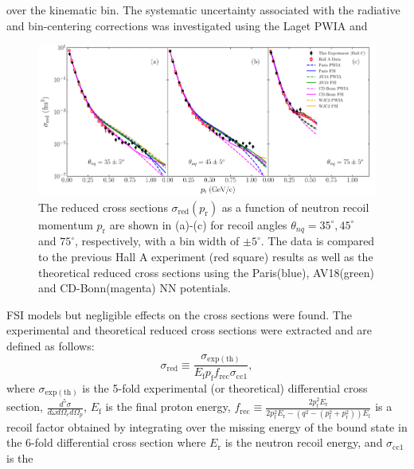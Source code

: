 over the kinematic bin. The systematic uncertainty associated with the radiative and bin-centering corrections was investigated using the Laget PWIA and 
\onecolumngrid
\begin{center}
\begin{figure}
\includegraphics[scale=0.46]{prl_plots/PRL_plot1_WJC2.pdf}
\caption{The reduced cross sections $\sigma_{\mathrm{red}}(p_{\mathrm{r}})$ as a function of neutron recoil momentum $p_{\mathrm{r}}$ are shown in (a)-(c) for recoil angles $\theta_{nq}=35^{\circ}, 45^{\circ}$ and $75^{\circ}$, respectively,
with a bin width of $\pm 5^{\circ}$. The data is compared to the previous Hall A experiment (red square) results \cite{PhysRevLett.107.262501} as well as the theoretical reduced cross sections using the Paris(blue),
AV18(green) and CD-Bonn(magenta) NN potentials.}
\label{fig:fig1}
\end{figure}
\end{center}
\twocolumngrid
\noindent FSI models but negligible effects on the cross sections were found. The experimental and theoretical reduced cross sections were extracted and are defined as follows:
\begin{equation}
\sigma_{\mathrm{red}} \equiv \frac{\sigma_{\mathrm{exp(th)}}}{E_{\mathrm{f}}p_{\mathrm{f}}f_{\mathrm{rec}}\sigma_{\mathrm{cc1}}},
\label{eq:1}
\end{equation}
\noindent where $\sigma_{\mathrm{exp(th)}}$ is the 5-fold experimental (or theoretical) differential cross section, $\frac{d^{5}\sigma}{d\omega d\Omega_{e} d\Omega_{p}}$,
$E_{\mathrm{f}}$ is the final proton energy, $f_{\mathrm{rec}}\equiv \frac{2p_{\mathrm{f}}^{2}E_{\mathrm{r}}}{2p_{\mathrm{f}}^{2}E_{\mathrm{r}} - (q^{2} - (p_{\mathrm{f}}^{2} + p_{\mathrm{r}}^{2}))E_{\mathrm{f}}}$
is a recoil factor obtained by integrating over the missing energy of the bound state in the 6-fold differential cross section where $E_{\mathrm{r}}$ is the neutron recoil energy, and $\sigma_{\mathrm{cc1}}$ is the
